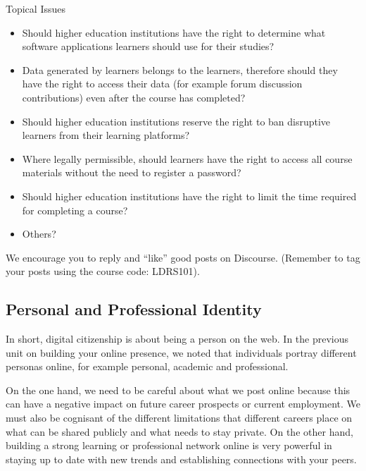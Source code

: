 \documentclass[
]{book}
\providecommand{\tightlist}{%
  \setlength{\itemsep}{0pt}\setlength{\parskip}{0pt}}
\theoremstyle{definition}
\theoremstyle{definition}
\theoremstyle{definition}
\theoremstyle{definition}
\theoremstyle{remark}
\begin{document}
\begin{reflect}
{Topical Issues}

\begin{itemize}
\tightlist
\item
  Should higher education institutions have the right to determine what software applications learners should use for their studies?\\
\item
  Data generated by learners belongs to the learners, therefore should they have the right to access their data (for example forum discussion contributions) even after the course has completed?\\
\item
  Should higher education institutions reserve the right to ban disruptive learners from their learning platforms?\\
\item
  Where legally permissible, should learners have the right to access all course materials without the need to register a password?\\
\item
  Should higher education institutions have the right to limit the time required for completing a course?\\
\item
  Others?
\end{itemize}

We encourage you to reply and ``like'' good posts on Discourse. (Remember to tag your posts using the course code: LDRS101).
\end{reflect}

\hypertarget{personal-and-professional-identity}{%
\subsection*{Personal and Professional Identity}\label{personal-and-professional-identity}}

In short, digital citizenship is about being a person on the web. In the previous unit on building your online presence, we noted that individuals portray different personas online, for example personal, academic and professional.

On the one hand, we need to be careful about what we post online because this can have a negative impact on future career prospects or current employment. We must also be cognisant of the different limitations that different careers place on what can be shared publicly and what needs to stay private. On the other hand, building a strong learning or professional network online is very powerful in staying up to date with new trends and establishing connections with your peers.
\end{document}
